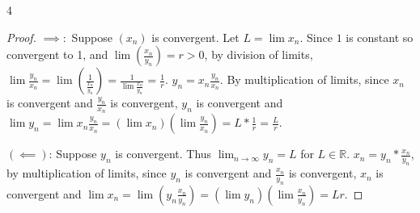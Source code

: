 \documentclass{article}
\newcommand{\R}{\mathbb{R}}
\begin{document}
\begin{PROB}{4}\label{Problem 4.}
\end{PROB}
\begin{proof}

    $\implies: $ Suppose $(x_n)$ is convergent. Let $L = \lim x_n$. Since $1$ is constant so convergent to 1, and $\lim \left(\frac{x_n}{y_n}\right) = r > 0$, by division of limits, $\lim \frac{y_n}{x_n} = \lim \left(\frac{1}{\frac{x_n}{y_n}}\right) = \frac{1}{\lim \frac{x_n}{y_n}} = \frac{1}{r}$. $y_n = x_n \frac{y_n}{x_n}$. By multiplication of limits, since $x_n$ is convergent and $\frac{y_n}{x_n}$ is convergent, $y_n$ is convergent and $\lim y_n = \lim x_n \frac{y_n}{x_n} = \left(\lim x_n\right)\left(\lim \frac{y_n}{x_n}\right) = L * \frac{1}{r} = \frac{L}{r}$.       
    


    $(\impliedby)$: Suppose $y_n$ is convergent. Thus $\lim_{n \to \infty} y_n = L$ for $L \in \R$. $x_n = y_n * \frac{x_n}{y_n}$, by multiplication of limits, since $y_n$ is convergent and $\frac{x_n}{y_n}$ is convergent, $x_n$ is convergent and $\lim x_n = \lim \left(y_n \frac{x_n}{y_n}\right) = \left(\lim y_n\right)\left(\lim \frac{x_n}{y_n}\right) = Lr$.         
\end{proof}
\end{document}
